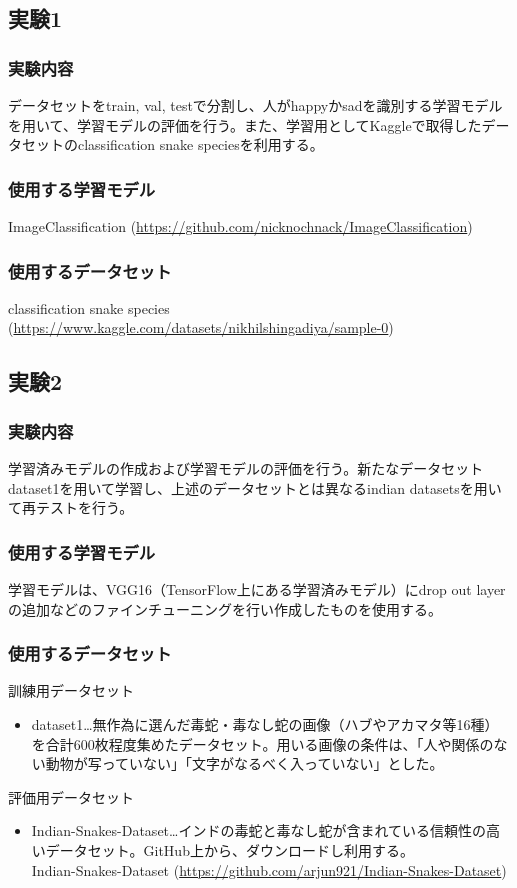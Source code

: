 \documentclass[a4paper, 11pt, titlepage]{jsarticle}
\begin{document}
\subsection{実験1}
\subsubsection{実験内容}
データセットをtrain, val, testで分割し、人がhappyかsadを識別する学習モデルを用いて、学習モデルの評価を行う。また、学習用としてKaggleで取得したデータセットのclassification snake speciesを利用する。\par
\subsubsection{使用する学習モデル}
ImageClassification (\url{https://github.com/nicknochnack/ImageClassification})
\subsubsection{使用するデータセット}
classification snake species (\url{https://www.kaggle.com/datasets/nikhilshingadiya/sample-0})

\subsection{実験2}
\subsubsection{実験内容}
学習済みモデルの作成および学習モデルの評価を行う。新たなデータセットdataset1を用いて学習し、上述のデータセットとは異なるindian datasetsを用いて再テストを行う。
\subsubsection{使用する学習モデル}
学習モデルは、VGG16（TensorFlow上にある学習済みモデル）にdrop out layerの追加などのファインチューニングを行い作成したものを使用する。
\subsubsection{使用するデータセット}
訓練用データセット
\begin{itemize}
\item dataset1…無作為に選んだ毒蛇・毒なし蛇の画像（ハブやアカマタ等16種）を合計600枚程度集めたデータセット。用いる画像の条件は、「人や関係のない動物が写っていない」「文字がなるべく入っていない」とした。
\end{itemize}\par
評価用データセット
\begin{itemize}
\item Indian-Snakes-Dataset…インドの毒蛇と毒なし蛇が含まれている信頼性の高いデータセット。GitHub上から、ダウンロードし利用する。\\
Indian-Snakes-Dataset  (\url{https://github.com/arjun921/Indian-Snakes-Dataset})
\end{itemize}
\end{document}

